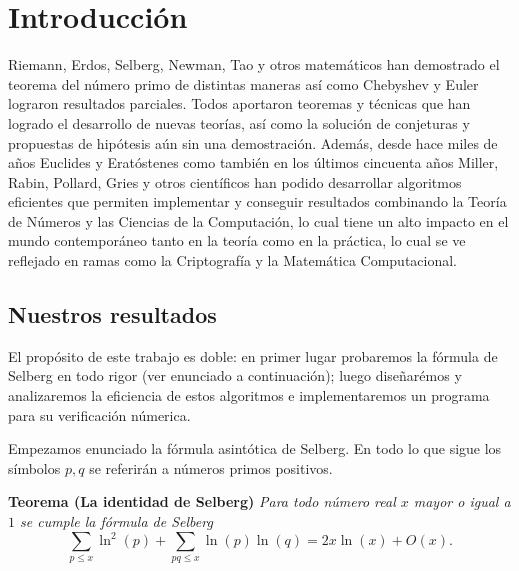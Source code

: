 \setlength{\headheight}{14.61858pt}
\pagestyle{fancy}

\chapter[Introducci\'on]
{Introducci\'on}
\label{Chapter01}

\vspace*{1cm}

Riemann, Erdos, Selberg, Newman, Tao y otros matem\'aticos han demostrado el
teorema del n\'umero primo de distintas maneras as\'i como Chebyshev y Euler
lograron resultados parciales.
Todos aportaron teoremas y t\'ecnicas que han
logrado el desarrollo de nuevas teor\'ias, as\'i como la soluci\'on
de conjeturas y propuestas de hip\'otesis a\'un sin una demostraci\'on.
Adem\'as, desde hace miles de a\~nos Euclides y Erat\'ostenes
como tambi\'en en los \'ultimos cincuenta a\~nos Miller, Rabin, Pollard, Gries
y otros cient\'ificos han podido desarrollar algoritmos eficientes que permiten
implementar y conseguir resultados combinando la Teor\'ia de N\'umeros y
las Ciencias de la Computaci\'on, lo cual tiene un alto impacto en
el mundo contempor\'aneo tanto en la teor\'ia como en la pr\'actica,
lo cual se ve reflejado en ramas como la Criptograf\'ia y
la Matem\'atica Computacional.
 
\section{Nuestros resultados}
El prop\'osito de este trabajo es doble: 
en primer lugar probaremos la f\'ormula de Selberg en todo rigor
(ver enunciado a continuaci\'on); 
luego diseñar\'emos y analizaremos la eficiencia de estos algoritmos e
implementaremos un programa para su verificaci\'on n\'umerica.

\bigskip

Empezamos enunciado la f\'ormula asint\'otica de Selberg. 
En todo lo que sigue los s\'imbolos \(p, q\) se referir\'an a
n\'umeros primos positivos.

\bigskip

\noindent
\textbf{Teorema (La identidad de Selberg)}
\textit{Para todo n\'umero real \(x\) mayor o igual a \(1\)
se cumple la f\'ormula de Selberg}
\[
  \sum_{p \leq x} \ln^2(p) + \sum_{pq \leq x} \ln(p) \ln(q) = 2x\ln(x) + O(x).
\]

